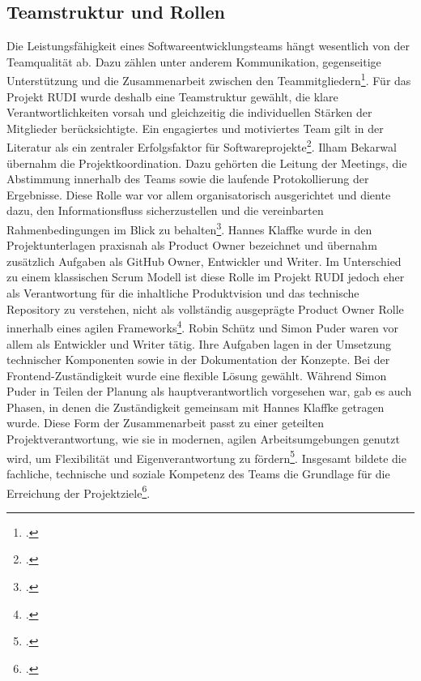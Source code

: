 \documentclass[12pt]{article}
\begin{document}
\subsection{Teamstruktur und Rollen}
Die Leistungsfähigkeit eines Softwareentwicklungsteams hängt wesentlich von der 
Teamqualität ab. Dazu zählen unter anderem Kommunikation, gegenseitige Unterstützung 
und die Zusammenarbeit zwischen den Teammitgliedern\footcite[Vgl.][124]{agbejule-2022}. 
Für das Projekt RUDI wurde deshalb eine Teamstruktur gewählt, die klare 
Verantwortlichkeiten vorsah und gleichzeitig die individuellen Stärken der 
Mitglieder berücksichtigte. Ein engagiertes und motiviertes Team gilt in der 
Literatur als ein zentraler Erfolgsfaktor für Softwareprojekte\footcite[Vgl.][1--2]{bogopa-2022}. 
Ilham Bekarwal übernahm die Projektkoordination. Dazu gehörten die Leitung der 
Meetings, die Abstimmung innerhalb des Teams sowie die laufende Protokollierung 
der Ergebnisse. Diese Rolle war vor allem organisatorisch ausgerichtet und 
diente dazu, den Informationsfluss sicherzustellen und die vereinbarten 
Rahmenbedingungen im Blick zu behalten\footcite[Vgl.][6]{gorog-2025}. Hannes 
Klaffke wurde in den Projektunterlagen praxisnah als Product Owner bezeichnet und 
übernahm zusätzlich Aufgaben als GitHub Owner, Entwickler und Writer. Im Unterschied 
zu einem klassischen Scrum Modell ist diese Rolle im Projekt RUDI jedoch eher als 
Verantwortung für die inhaltliche Produktvision und das technische Repository zu 
verstehen, nicht als vollständig ausgeprägte Product Owner Rolle innerhalb eines 
agilen Frameworks\footcite[Vgl.][3]{gorog-2025}. 
Robin Schütz und Simon Puder waren vor allem als Entwickler und Writer tätig. Ihre 
Aufgaben lagen in der Umsetzung technischer Komponenten sowie in der Dokumentation 
der Konzepte. Bei der Frontend-Zuständigkeit wurde eine flexible Lösung gewählt. 
Während Simon Puder in Teilen der Planung als hauptverantwortlich vorgesehen war, 
gab es auch Phasen, in denen die Zuständigkeit gemeinsam mit Hannes Klaffke getragen 
wurde. Diese Form der Zusammenarbeit passt zu einer geteilten Projektverantwortung, 
wie sie in modernen, agilen Arbeitsumgebungen genutzt wird, um Flexibilität und 
Eigenverantwortung zu fördern\footcite[Vgl.][2--3]{gorog-2025}. Insgesamt bildete 
die fachliche, technische und soziale Kompetenz des Teams die Grundlage für die 
Erreichung der Projektziele\footcite[Vgl.][842--843]{rathor-2024}.
\end{document}
